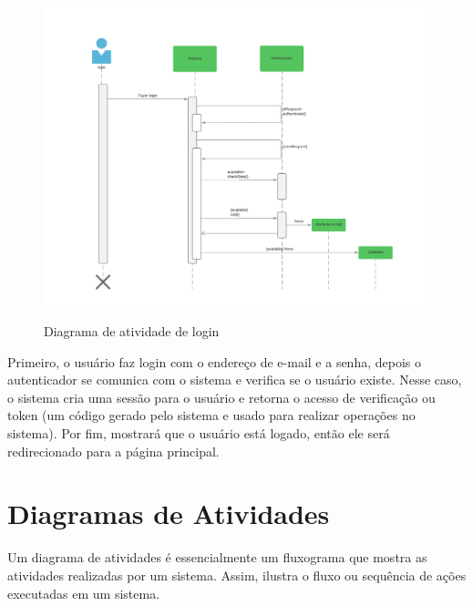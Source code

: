 \begin{figure}[H]
  \begin{center}
        \caption{Diagrama de atividade de login} \label{afp}
        \includegraphics[width=15cm]{Pictures/diagram/sequencia.png} \\


  \end{center}
\end{figure}
Primeiro, o usuário faz login com o endereço de e-mail e a senha, depois o autenticador se comunica com o sistema e verifica se o usuário existe. Nesse caso, o sistema cria uma sessão para o usuário e retorna o acesso de verificação ou token (um código gerado pelo sistema e usado para realizar operações no sistema). Por fim, mostrará que o usuário está logado, então ele será redirecionado para a página principal.
\section{Diagramas de Atividades}
Um diagrama de atividades é essencialmente um fluxograma que mostra as atividades realizadas por um sistema. Assim, ilustra o fluxo ou sequência de ações executadas em um sistema.

